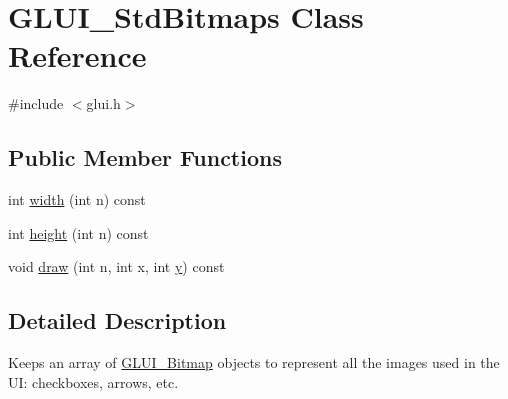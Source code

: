 \hypertarget{class_g_l_u_i___std_bitmaps}{\section{G\+L\+U\+I\+\_\+\+Std\+Bitmaps Class Reference}
\label{class_g_l_u_i___std_bitmaps}
}


{\ttfamily \#include $<$glui.\+h$>$}

\subsection*{Public Member Functions}
\begin{DoxyCompactItemize}
\item 
int \hyperlink{class_g_l_u_i___std_bitmaps_ad3a2b8300692f83de6329545f716597f}{width} (int n) const 
\item 
int \hyperlink{class_g_l_u_i___std_bitmaps_a300ea4a965d0b80777bcc7e0e7117dd8}{height} (int n) const 
\item 
void \hyperlink{class_g_l_u_i___std_bitmaps_ae073d4320cc030a1d0a7032d54334838}{draw} (int n, int x, int \hyperlink{_ice_utils_8h_aa7ffaed69623192258fb8679569ff9ba}{y}) const 
\end{DoxyCompactItemize}


\subsection{Detailed Description}
Keeps an array of \hyperlink{class_g_l_u_i___bitmap}{G\+L\+U\+I\+\_\+\+Bitmap} objects to represent all the images used in the U\+I\+: checkboxes, arrows, etc. 

